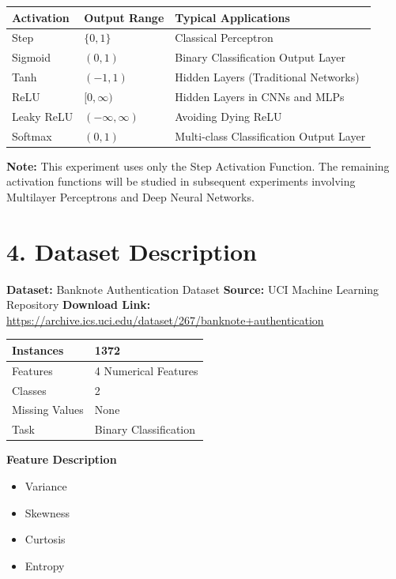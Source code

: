 \documentclass[11pt]{article}
\begin{document}
\begin{center}
\begin{tabular}{|p{2.5cm}|p{3cm}|p{6cm}|}
\hline
\textbf{Activation} & \textbf{Output Range} & \textbf{Typical Applications}\\
\hline
Step & $\{0,1\}$ & Classical Perceptron\\
\hline
Sigmoid & $(0,1)$ & Binary Classification Output Layer\\
\hline
Tanh & $(-1,1)$ & Hidden Layers (Traditional Networks)\\
\hline
ReLU & $[0,\infty)$ & Hidden Layers in CNNs and MLPs\\
\hline
Leaky ReLU & $(-\infty,\infty)$ & Avoiding Dying ReLU\\
\hline
Softmax & $(0,1)$ & Multi-class Classification Output Layer\\
\hline
\end{tabular}
\end{center}

\textbf{Note:} This experiment uses only the Step Activation Function. The remaining activation functions will be studied in subsequent experiments involving Multilayer Perceptrons and Deep Neural Networks.


\section*{4. Dataset Description}

\textbf{Dataset:} Banknote Authentication Dataset
\textbf{Source:} UCI Machine Learning Repository
\textbf{Download Link:}
\url{https://archive.ics.uci.edu/dataset/267/banknote+authentication}

\begin{center}
\begin{tabular}{|l|l|}
\hline
Instances & 1372\\
\hline
Features & 4 Numerical Features\\
\hline
Classes & 2\\
\hline
Missing Values & None\\
\hline
Task & Binary Classification\\
\hline
\end{tabular}
\end{center}

\textbf{Feature Description}


\begin{itemize}
\item Variance
\item Skewness
\item Curtosis
\item Entropy
\end{itemize}
\end{document}
